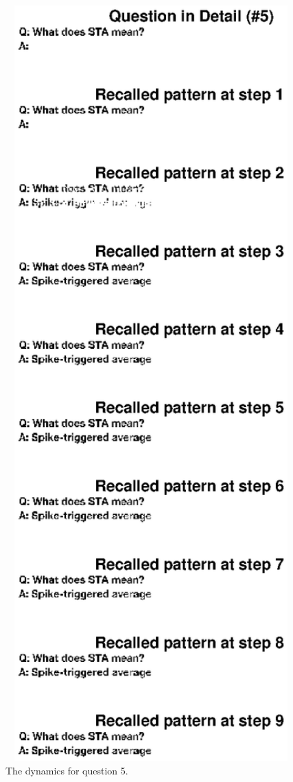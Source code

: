 \documentclass[11pt, oneside]{article}
\begin{document}
  \begin{figure}[H]
  \includegraphics[width=1\textwidth]{q5detail.eps}
  \caption{The dynamics for question 5.}
  \label{fig:q5detail}
  \end{figure}
\end{document}
